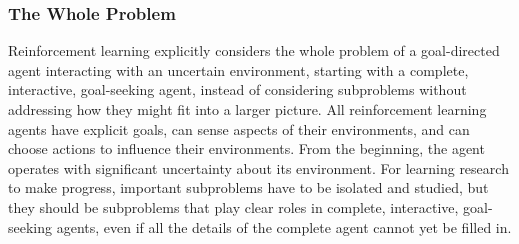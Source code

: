 \subsubsection{The Whole Problem}
Reinforcement learning explicitly considers the whole problem of a goal-directed agent interacting with an uncertain environment,  starting with a complete, interactive, goal-seeking agent, instead of considering subproblems without addressing how they might fit into a larger picture.  All reinforcement learning agents have explicit goals, can sense aspects of their environments, and can choose actions to influence their environments.  From the beginning, the agent operates with significant uncertainty about its environment.  For learning research to make progress, important subproblems have to be isolated and studied, but they should be subproblems that play clear roles in complete, interactive, goal-seeking agents, even if all the details of the complete agent cannot yet be filled in.
